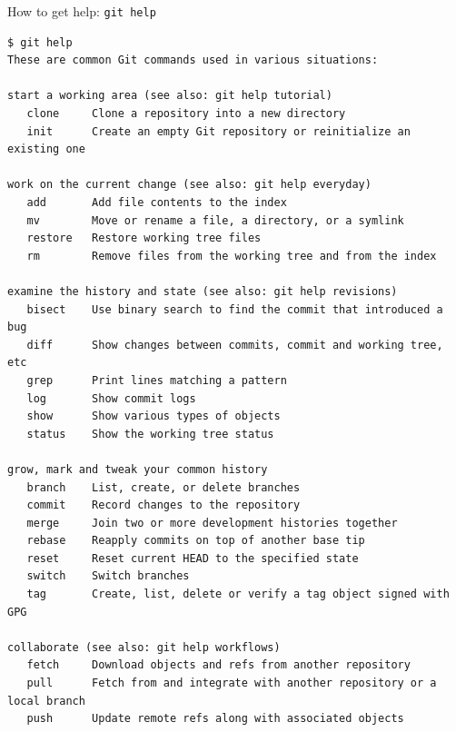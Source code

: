 \documentclass[svgnames]{beamer}
\begin{document}
\begin{frame}[fragile]{How to get help: \texttt{git help}}
 \begin{lstlisting}[basicstyle={\ttfamily\tiny}]
$ git help
These are common Git commands used in various situations:

start a working area (see also: git help tutorial)
   clone     Clone a repository into a new directory
   init      Create an empty Git repository or reinitialize an existing one

work on the current change (see also: git help everyday)
   add       Add file contents to the index
   mv        Move or rename a file, a directory, or a symlink
   restore   Restore working tree files
   rm        Remove files from the working tree and from the index

examine the history and state (see also: git help revisions)
   bisect    Use binary search to find the commit that introduced a bug
   diff      Show changes between commits, commit and working tree, etc
   grep      Print lines matching a pattern
   log       Show commit logs
   show      Show various types of objects
   status    Show the working tree status

grow, mark and tweak your common history
   branch    List, create, or delete branches
   commit    Record changes to the repository
   merge     Join two or more development histories together
   rebase    Reapply commits on top of another base tip
   reset     Reset current HEAD to the specified state
   switch    Switch branches
   tag       Create, list, delete or verify a tag object signed with GPG

collaborate (see also: git help workflows)
   fetch     Download objects and refs from another repository
   pull      Fetch from and integrate with another repository or a local branch
   push      Update remote refs along with associated objects
 \end{lstlisting}
\end{frame}
\end{document}
